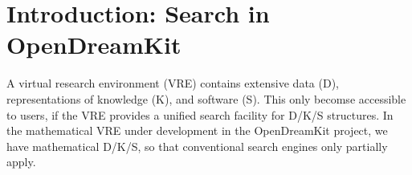 \documentclass{deliverablereport}
\author{Michael Kohlhase \& Alexandru Glontaru}
\def\pn{OpenDreamKit\xspace}
\begin{document}
\maketitle\vfill
\begin{abstract}
  A virtual research environment (VRE) contains extensive data (D), representations of
  knowledge (K), and software (S). This only becomse accessible to users, if the VRE
  provides a unified search facility for D/K/S structures. In the mathematical VRE under
  development in the \pn project, we have mathematical D/K/S, so that conventional search
  engines only partially apply. 

  In this report, we present the MathWebSearch engine, an open-source, open-format,
  content-oriented full-text search engine for mathematical formulae encoded in Content
  MathML. We eventually want to use it for searching notebooks, active documents and the
  Math-in-the-Middle Ontology in the \pn VRE. This report only presents the current system
  that can search mathematical documents written in {\LaTeX} or HTML5. 


 
 \end{abstract}
\vfill
\newpage\tableofcontents\newpage

\section{Introduction: Search in \pn}

A virtual research environment (VRE) contains extensive data (D), representations of
knowledge (K), and software (S). This only becomse accessible to users, if the VRE
provides a unified search facility for D/K/S structures. In the mathematical VRE under
development in the \pn project, we have mathematical D/K/S, so that conventional search
engines only partially apply. 
\end{document}
